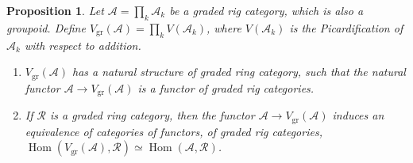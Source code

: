 \documentclass[JEP,XML,SOM,Unicode,published]{cedram}
\theoremstyle{plain}
\newtheorem{proposition}[theorem]{Proposition}
\theoremstyle{definition}
\newcommand{\Acal}{\mathcal A}
\newcommand{\Rcal}{\mathcal R}
\DeclareMathOperator{\Hom}{Hom}
\begin{document}
\begin{proposition}\label{prop:rig-to-ring-2}
Let $\Acal=\prod_{k}\Acal_{k}$ be a graded rig category, which is also a groupoid. Define $V_{\mathrm{gr}}(\Acal)=\prod_{k}V(\Acal_{k})$, where $V(\Acal_{k})$ is the Picardification of $\Acal_{k}$ with respect to addition.
\begin{enumerate}
\item $V_{\mathrm{gr}}(\Acal)$ has a natural structure of graded ring category, such that the natural functor $\Acal\to V_{\mathrm{gr}}(\Acal)$ is a functor of graded rig categories.
\item If $\Rcal$ is a graded ring category, then the functor $\Acal\to V_{\mathrm{gr}}(\Acal)$ induces an equivalence of categories of functors, of graded rig categories, $\Hom(V_{\mathrm{gr}}(\Acal),\Rcal)\simeq\Hom(\Acal,\Rcal)$.
\end{enumerate}
\end{proposition}
\end{document}
